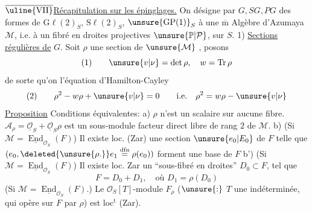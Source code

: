 $\overline{\text{\uline{VII}}}$\quad \uline{Récapitulation sur les épinglages.}
 On désigne par $G,SG,PG$ des formes de $\mathrm G\ell(2)_S$, $\mathrm S\ell(2)_S$, $\unsure{\mathrm{GP}(1)}_S$  à une $\overline{\mathrm m}$ Algèbre d'Azumaya $\mathcal M$, i.e. à un fibré en droites projectives $\unsure{\mathbb P|\mathcal P}$, sur $S$.
1) \uline{Sections régulières de} $G$.
Soit $\rho$ une section de $\unsure{\mathcal M}$ , posons
\[
(1)\qquad \unsure{v|\nu}=\det\rho,\quad w=\operatorname{Tr}\rho
\]
de sorte qu'on  l'équation d'Hamilton-Cayley
\[
(2)\qquad \rho^2-w\rho+\unsure{v|\nu}=0\qquad\text{i.e.}\quad\rho^2=w\rho-\unsure{v|\nu}
\]
\uline{Proposition} Conditions équivalentes:
a) $\rho$ n'est un scalaire sur aucune fibre.
 $\mathcal A_\rho=\underline{\mathcal O}_S+\underline{\mathcal O}_S\rho$ est un sous-module  facteur direct libre de rang $2$ de $\mathcal M$.
b) (Si $\mathcal M=\underline{\operatorname{End}}_{\mathcal O_S}(F)$) Il existe loc. (Zar) une section $\unsure{e_0|E_0}$ de $F$ telle que $(e_0,\deleted{\unsure{\rho.}}e_1\mathrel{\overset{\mathrm{dfn}}{=}}\rho(e_0))$ forment une base de $F$
b') (Si $\mathcal M=\underline{\operatorname{End}}_{\mathcal O_S}(F)$) Il existe loc. Zar un ``sous-fibré en droites'' $D_0\subset F$, tel que
\[
F=D_0+D_1,\quad\text{où }D_1=\rho(D_0)
\]
 (Si $\mathcal M=\underline{\operatorname{End}}_{\mathcal O_S}(F)$.) Le $\mathcal O_S[T]$-module $F_\rho$ ($\unsure{:}$ $T$  une indéterminée, qui opère sur $F$ par $\rho$) est   loc$^{\mathrm t}$ (Zar).
